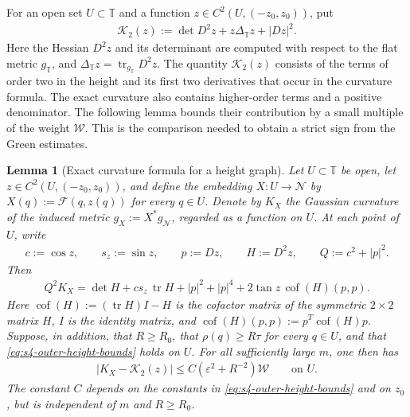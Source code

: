 \documentclass[a4paper,11pt,oneside,reqno]{amsart}
\numberwithin{equation}{section}
\newtheorem{lemma}[theorem]{Lemma}
\theoremstyle{definition}
\begin{document}
For an open set $U\subset\mathbb T$ and a function
$z\in C^2(U,(-z_0,z_0))$, put
%
\begin{align}
    \label{eq:s4-quadratic-curvature}
    \mathcal K_2(z):=\det D^2z+z\Delta_{\mathbb T}z+|Dz|^2.
\end{align}
%
Here the Hessian $D^2z$ and its determinant are computed
with respect to the flat metric $g_{\mathbb T}$, and
$\Delta_{\mathbb T}z=\operatorname{tr}_{g_{\mathbb T}}D^2z$.
The quantity $\mathcal K_2(z)$ consists of the terms of
order two in the height and its first two derivatives
that occur in the curvature formula. The exact curvature
also contains higher-order terms and a positive denominator.
The following lemma bounds their contribution by a small
multiple of the weight $\mathcal W$. This is the comparison
needed to obtain a strict sign from the Green estimates.

\begin{lemma}[Exact curvature formula for a height graph]
    \label{lem:s4-exact-height-curvature}
    Let $U\subset\mathbb T$ be open, let
    $z\in C^2(U,(-z_0,z_0))$, and define the embedding
    $X:U\to\mathcal N$ by
    $X(q):=\mathcal F(q,z(q))$ for every $q\in U$.
    Denote by $K_X$ the Gaussian curvature of the induced
    metric $g_X:=X^*g_{\mathcal N}$, regarded as a function
    on $U$.
    At each point of $U$, write
    \begin{align*}
        c:=\cos z,\qquad s_z:=\sin z,\qquad
        p:=Dz,\qquad H:=D^2z,\qquad Q:=c^2+|p|^2.
    \end{align*}
    Then
    \begin{align}
        \label{eq:s4-exact-height-curvature}
        Q^2K_X=\det H+c s_z\,\operatorname{tr}H+|p|^2+|p|^4
        +2\tan z\,\operatorname{cof}(H)(p,p).
    \end{align}
    Here $\operatorname{cof}(H):=(\operatorname{tr}H)I-H$
    is the cofactor matrix of the symmetric $2\times2$
    matrix $H$, $I$ is the identity matrix, and
    $\operatorname{cof}(H)(p,p):=p^T\operatorname{cof}(H)p$.
    Suppose, in addition, that $R\geq R_0$, that
    $\rho(q)\geq R\tau$ for every $q\in U$, and that
    \eqref{eq:s4-outer-height-bounds} holds on $U$.
    For all sufficiently large $m$, one then has
    \begin{align}
        \label{eq:s4-height-quadratic-error}
        |K_X-\mathcal K_2(z)|
        \leq C(\varepsilon^2+R^{-2})\mathcal W
        \qquad\mbox{on }U.
    \end{align}
    The constant $C$ depends on the constants in
    \eqref{eq:s4-outer-height-bounds} and on $z_0$, but
    is independent of $m$ and $R\geq R_0$.
\end{lemma}
\end{document}
